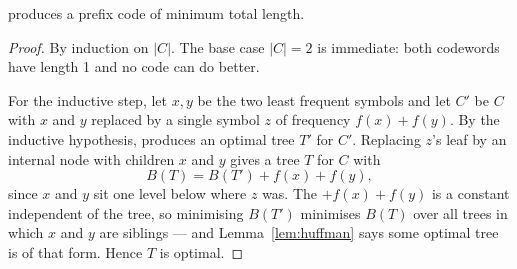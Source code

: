 \begin{theorem}\label{thm:huffman}
 produces a prefix code of minimum total length.
\end{theorem}

\begin{proof}
By induction on $|C|$. The base case $|C| = 2$ is immediate: both codewords
have length 1 and no code can do better.

\smallskip
For the inductive step, let $x, y$ be the two least frequent symbols and let
$C'$ be $C$ with $x$ and $y$ replaced by a single symbol $z$ of frequency
$f(x)+f(y)$. By the inductive hypothesis,  produces an optimal
tree $T'$ for $C'$. Replacing $z$'s leaf by an internal node with children $x$
and $y$ gives a tree $T$ for $C$ with
\[ B(T) = B(T') + f(x) + f(y), \]
since $x$ and $y$ sit one level below where $z$ was. The $+f(x)+f(y)$ is a
constant independent of the tree, so minimising $B(T')$ minimises $B(T)$ over
all trees in which $x$ and $y$ are siblings --- and Lemma~\ref{lem:huffman}
says some optimal tree is of that form. Hence $T$ is optimal.
\end{proof}

